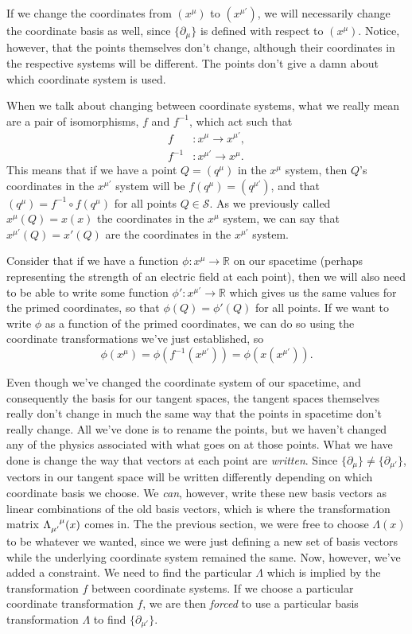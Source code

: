 If we change the coordinates from $(x^\mu)$ to $(x^{\mu'})$, we will necessarily change the coordinate basis as well, since $\{\partial_\mu\}$ is defined with respect to $(x^\mu)$.
Notice, however, that the points themselves don't change, although their coordinates in the respective systems will be different.
The points don't give a damn about which coordinate system is used.

When we talk about changing between coordinate systems, what we really mean are a pair of isomorphisms, $f$ and $f^{-1}$, which act such that
\begin{align*}
    f &: x^\mu \to x^{\mu'}, \\
    f^{-1} &: x^{\mu'} \to x^\mu.
\end{align*}
This means that if we have a point $Q = (q^\mu)$ in the $x^\mu$ system, then $Q$'s coordinates in the $x^{\mu'}$ system will be $f(q^\mu) = (q^{\mu'})$, and that $(q^\mu) = f^{-1} \circ f (q^\mu)$ for all points $Q \in \mathcal{S}$.
As we previously called $x^\mu (Q) = x(x)$ the coordinates in the $x^\mu$ system, we can say that $x^{\mu'}(Q) = x'(Q)$ are the coordinates in the $x^{\mu'}$ system.

Consider that if we have a function $\phi : x^\mu \to \mathbb{R}$ on our spacetime (perhaps representing the strength of an electric field at each point), then we will also need to be able to write some function $\phi' : x^{\mu'} \to \mathbb{R}$ which gives us the same values for the primed coordinates, so that $\phi(Q) = \phi'(Q)$ for all points.
If we want to write $\phi$ as a function of the primed coordinates, we can do so using the coordinate transformations we've just established, so 
\[ \phi(x^\mu) = \phi(f^{-1}(x^{\mu'})) = \phi(x(x^{\mu'})). \]

Even though we've changed the coordinate system of our spacetime, and consequently the basis for our tangent spaces, the tangent spaces themselves really don't change in much the same way that the points in spacetime don't really change.
All we've done is to rename the points, but we haven't changed any of the physics associated with what goes on at those points.
What we have done is change the way that vectors at each point are \emph{written}.
Since $\{\partial_\mu\} \not= \{\partial_{\mu'}\}$, vectors in our tangent space will be written differently depending on which coordinate basis we choose.
We \emph{can}, however, write these new basis vectors as linear combinations of the old basis vectors, which is where the transformation matrix $\tensor{\Lambda}{_{\mu'}^{\mu}}(x)$ comes in.
The the previous section, we were free to choose $\Lambda(x)$ to be whatever we wanted, since we were just defining a new set of basis vectors while the underlying coordinate system remained the same.
Now, however, we've added a constraint.
We need to find the particular $\Lambda$ which is implied by the transformation $f$ between coordinate systems.
If we choose a particular coordinate transformation $f$, we are then \emph{forced} to use a particular basis transformation $\Lambda$ to find $\{\partial_{\mu'}\}$.


